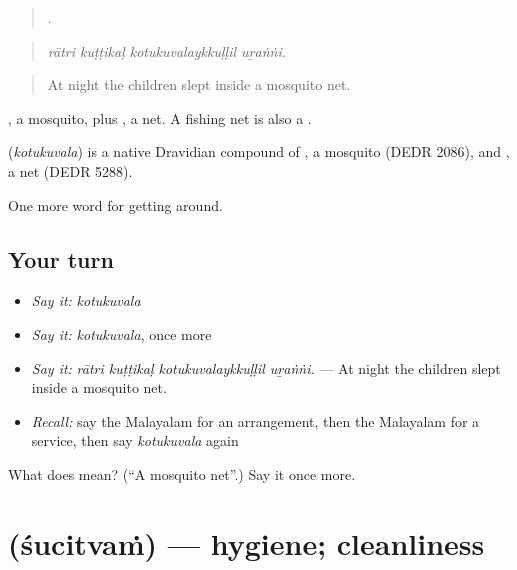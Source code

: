 \begin{quote}
   .
\end{quote}

\begin{quote}
\emph{rātri kuṭṭikaḷ kotukuvalaykkuḷḷil uṟaṅṅi.}
\end{quote}

\begin{quote}
At night the children slept inside a mosquito net.
\end{quote}

, a mosquito, plus , a net. A fishing net is also a .

\begin{cousinweb}
\textbf{} (\emph{kotukuvala}) is a native Dravidian compound of , a mosquito (DEDR 2086), and , a net (DEDR 5288).
\end{cousinweb}

\begin{grammarlens}[title={What you've built}]
One more word for getting around.
\end{grammarlens}

\subsection*{Your turn}
\begin{itemize}
\raggedright
  \item \emph{Say it:} \emph{kotukuvala}
  \item \emph{Say it:} \emph{kotukuvala}, once more
  \item \emph{Say it:} \emph{rātri kuṭṭikaḷ kotukuvalaykkuḷḷil uṟaṅṅi.} — At night the children slept inside a mosquito net.
  \item \emph{Recall:} say the Malayalam for an arrangement, then the Malayalam for a service, then say \emph{kotukuvala} again
\end{itemize}

\begin{tcolorbox}[breakable,colback=teal!4,colframe=teal!35!black,title={Before you move on}]
What does  mean? (\textquotedblleft{}A mosquito net\textquotedblright{}.) Say it once more.
\end{tcolorbox}
\section[\texorpdfstring{\ml{ശുചിത്വം} (śucitvaṁ)}{ശുചിത്വം (śucitvaṁ)}]{ (śucitvaṁ) — hygiene; cleanliness}

